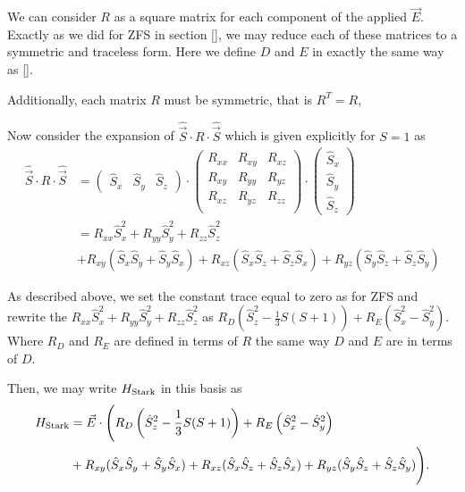 We can consider $R$ as a square matrix for each component of the applied $\vec{E}$. Exactly as we did for ZFS in section \ref{}, we may reduce each of these matrices to a symmetric and traceless form. Here we define $D$ and $E$ in exactly the same way as \ref{}. 

Additionally, each matrix $R$ must be symmetric, that is $R^T = R$, 

Now consider the expansion of $\hat{\vec{S}}\cdot R \cdot \hat{\vec{S}}$ which is given explicitly for $S=1$ as 
\begin{equation}
    \begin{align}
        \hat{\vec{S}}\cdot R \cdot \hat{\vec{S}} &= 
    \begin{pmatrix}
        \hat{S}_x & \hat{S}_y & \hat{S}_z
    \end{pmatrix}
    \cdot 
    \begin{pmatrix}
        R_{xx} & R_{xy} & R_{xz} \\
        R_{xy} & R_{yy} & R_{yz} \\
        R_{xz} & R_{yz} & R_{zz} \\
    \end{pmatrix}
    \cdot 
    \begin{pmatrix}
        \hat{S}_x \\ \hat{S}_y \\ \hat{S}_z
    \end{pmatrix}\\ 
         &= R_{xx} \hat{S}_x^2  + R_{yy} \hat{S}_y^2 + R_{zz} \hat{S}_z^2 \\
         &+   R_{xy}(\hat{S}_{x}\hat{S}_y + \hat{S}_y \hat{S}_x) 
        +   R_{xz}(\hat{S}_{x}\hat{S}_z + \hat{S}_z \hat{S}_x) 
        +   R_{yz}(\hat{S}_{y}\hat{S}_z + \hat{S}_z \hat{S}_y) 
    \end{align}
    \label{eq:}
\end{equation}

As described above, we set the constant trace equal to zero as for ZFS and rewrite the $R_{xx} \hat{S}_x^2  + R_{yy} \hat{S}_y^2 + R_{zz} \hat{S}_z^2$ as $R_D \left(\hat{S}_z^2 - \frac{1}{3}S(S+1)\right) + R_E\left(\hat{S}_x^2 - \hat{S}_y^2\right)$. Where $R_D$ and $R_E$ are defined in terms of $R$ the same way $D$ and $E$ are in terms of $D$. 

Then, we may write $H_{\ce{Stark}}$ in this basis as 
\begin{equation}
    \begin{align}
        H_{\ce{Stark}} &=\vec{E} \cdot \Biggl(  R_D \left(\hat{S}_z^2 - \frac{1}{3}S(S+1)\right) + R_E\left(\hat{S}_x^2 - \hat{S}_y^2\right) \\ &+ 
   R_{xy}(\hat{S}_{x}\hat{S}_y + \hat{S}_y \hat{S}_x) 
        +   R_{xz}(\hat{S}_{x}\hat{S}_z + \hat{S}_z \hat{S}_x) 
        +   R_{yz}(\hat{S}_{y}\hat{S}_z + \hat{S}_z \hat{S}_y) \Biggr).
    \end{align}
    \label{eq:}
\end{equation}

